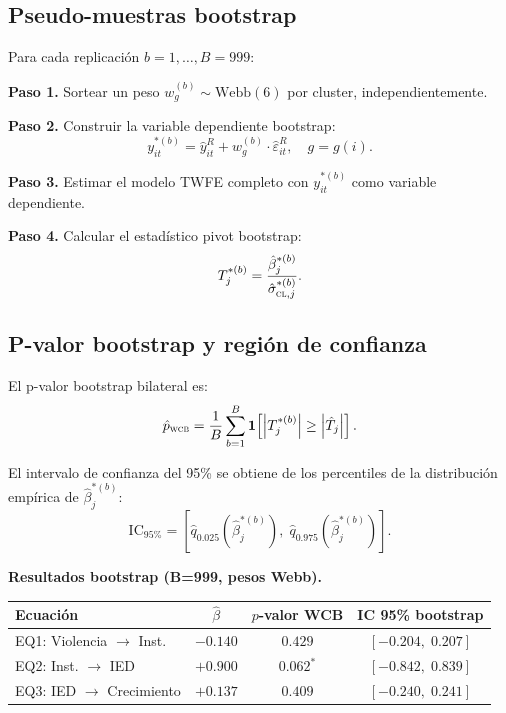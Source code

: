 \documentclass[12pt, a4paper]{article}
\theoremstyle{definition}
\newcommand{\abs}[1]{\left| #1 \right|}
\begin{document}
\subsection{Pseudo-muestras bootstrap}

Para cada replicación $b = 1, \ldots, B = 999$:

\textbf{Paso 1.} Sortear un peso $w_g^{(b)} \sim \text{Webb}(6)$ por cluster, independientemente.

\textbf{Paso 2.} Construir la variable dependiente bootstrap:
\[
  y^{*(b)}_{it} = \hat{y}^R_{it} + w_g^{(b)} \cdot \hat\varepsilon^R_{it}, \quad g = g(i).
\]

\textbf{Paso 3.} Estimar el modelo TWFE completo con $y^{*(b)}_{it}$ como variable dependiente.

\textbf{Paso 4.} Calcular el estadístico pivot bootstrap:
\[
  T^{*(b)}_j = \frac{\hat\beta^{*(b)}_j}{\hat\sigma^{*(b)}_{\textsc{cl},j}}.
\]

\subsection{P-valor bootstrap y región de confianza}

El p-valor bootstrap bilateral es:
\[
  \hat{p}_{\textsc{wcb}} = \frac{1}{B}\sum_{b=1}^{B}\mathbf{1}\!\left[\abs{T^{*(b)}_j} \geq \abs{\hat{T}_j}\right].
\]

El intervalo de confianza del 95\% se obtiene de los percentiles de la distribución empírica de $\hat\beta^{*(b)}_j$:
\[
  \mathrm{IC}_{95\%} = \left[\hat{q}_{0.025}\!\left(\hat\beta^{*(b)}_j\right),\; \hat{q}_{0.975}\!\left(\hat\beta^{*(b)}_j\right)\right].
\]

\begin{resultbox}
\textbf{Resultados bootstrap (B=999, pesos Webb).}
\begin{center}
\begin{tabular}{lccc}
\toprule
Ecuación & $\hat\beta$ & $p$-valor WCB & IC 95\% bootstrap \\
\midrule
EQ1: Violencia $\to$ Inst. & $-0.140$ & $0.429$ & $[-0.204,\; 0.207]$ \\
EQ2: Inst. $\to$ IED       & $+0.900$ & $0.062^*$ & $[-0.842,\; 0.839]$ \\
EQ3: IED $\to$ Crecimiento & $+0.137$ & $0.409$ & $[-0.240,\; 0.241]$ \\
\bottomrule
\end{tabular}
\end{center}
\end{resultbox}
\end{document}
